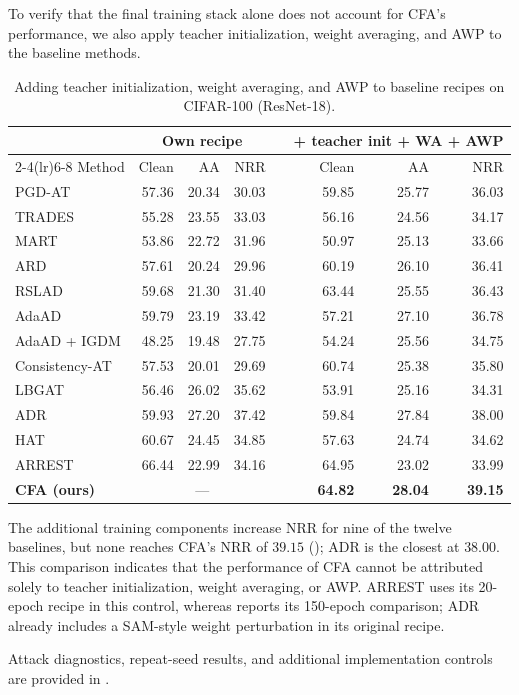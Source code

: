 To verify that the final training stack alone does not account for CFA's
performance, we also apply teacher initialization, weight averaging, and AWP
to the baseline methods.

\begin{table}[!htbp]
  \centering
  \scriptsize
  \setlength{\tabcolsep}{4pt}
  \caption{
  Adding teacher initialization, weight averaging, and AWP to baseline
  recipes on CIFAR-100 (ResNet-18).
  }
  \label{tab:baselinestack}
  \begin{tabular}{lrrrcrrr}
    \toprule
    & \multicolumn{3}{c}{Own recipe}
    && \multicolumn{3}{c}{+ teacher init + WA + AWP} \\
    \cmidrule(lr){2-4}\cmidrule(lr){6-8}
    Method & Clean & AA & NRR && Clean & AA & NRR \\
    \midrule
    PGD-AT & 57.36 & 20.34 & 30.03
           && 59.85 & 25.77 & 36.03 \\
    TRADES & 55.28 & 23.55 & 33.03
           && 56.16 & 24.56 & 34.17 \\
    MART & 53.86 & 22.72 & 31.96
         && 50.97 & 25.13 & 33.66 \\
    ARD & 57.61 & 20.24 & 29.96
        && 60.19 & 26.10 & 36.41 \\
    RSLAD & 59.68 & 21.30 & 31.40
          && 63.44 & 25.55 & 36.43 \\
    AdaAD & 59.79 & 23.19 & 33.42
          && 57.21 & 27.10 & 36.78 \\
    AdaAD + IGDM & 48.25 & 19.48 & 27.75
                 && 54.24 & 25.56 & 34.75 \\
    Consistency-AT & 57.53 & 20.01 & 29.69
                   && 60.74 & 25.38 & 35.80 \\
    LBGAT & 56.46 & 26.02 & 35.62
          && 53.91 & 25.16 & 34.31 \\
    ADR & 59.93 & 27.20 & 37.42
        && 59.84 & 27.84 & 38.00 \\
    HAT & 60.67 & 24.45 & 34.85
        && 57.63 & 24.74 & 34.62 \\
    ARREST & 66.44 & 22.99 & 34.16
           && 64.95 & 23.02 & 33.99 \\
    \midrule
    \textbf{CFA (ours)}
      & \multicolumn{3}{c}{---}
      && \textbf{64.82} & \textbf{28.04} & \textbf{39.15} \\
    \bottomrule
  \end{tabular}
\end{table}

The additional training components increase NRR for nine of the twelve
baselines, but none reaches CFA's NRR of \(39.15\)
(); ADR is the closest at \(38.00\).
This comparison indicates that the performance of CFA cannot be attributed
solely to teacher initialization, weight averaging, or AWP.
ARREST uses its 20-epoch recipe in this control, whereas
 reports its 150-epoch comparison; ADR already includes a
SAM-style weight perturbation in its original recipe.

Attack diagnostics, repeat-seed results, and additional implementation
controls are provided in .